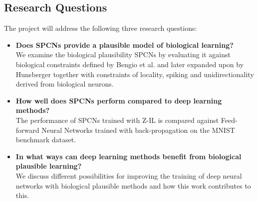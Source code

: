 \documentclass[a4paper,11pt]{article} %
\begin{document}
\subsection{Research Questions}
The project will address the following three research questions:
\begin{itemize}
  \item \textbf{Does SPCNs provide a plausible model of biological learning?} \vspace{5pt} \\ 
  We examine the biological plausibility SPCNs by evaluating it against biological constraints defined by Bengio et al. \cite{BengioLBL15} and later expanded upon by Hunsberger \cite{Eric2018} together with constraints of locality, spiking and unidirectionality derived from biological neurons. 

  \item \textbf{How well does SPCNs perform compared to deep learning methods?} \vspace{5pt} \\
  The performance of SPCNs trained with Z-IL is compared against Feed-forward Neural Networks trained with back-propagation on the MNIST benchmark dataset.

  \item \textbf{In what ways can deep learning methods benefit from biological plausible learning?} \vspace{5pt} \\
  We discuss different possibilities for improving the training of deep neural networks with biological plausible methods and how this work contributes to this. %
\end{itemize}
\end{document}
